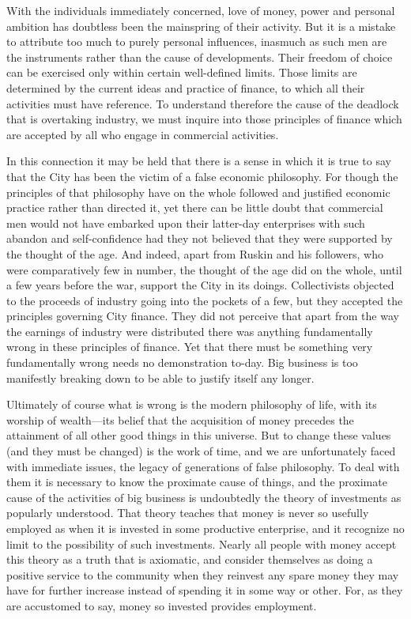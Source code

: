 \documentclass{book}
\begin{document}
With the individuals immediately concerned, love of money, power and personal ambition has doubtless been the mainspring of their activity. But it is a mistake to attribute too much to purely personal influences, inasmuch as such men are the instruments rather than the cause of developments. Their freedom of choice can be exercised only within certain well-defined limits. Those limits are determined by the current ideas and practice of finance, to which all their activities must have reference. To understand therefore the cause of the deadlock that is overtaking industry, we must inquire into those principles of finance which are accepted by all who engage in commercial activities.

In this connection it may be held that there is a sense in which it is true to say that the City has been the victim of a false economic philosophy. For though the principles of that philosophy have on the whole followed and justified economic practice rather than directed it, yet there can be little doubt that commercial men would not have embarked upon their latter-day enterprises with such abandon and self-confidence had they not believed that they were supported by the thought of the age. And indeed, apart from Ruskin and his followers, who were comparatively few in number, the thought of the age did on the whole, until a few years before the war, support the City in its doings. Collectivists objected to the proceeds of industry going into the pockets of a few, but they accepted the principles governing City finance. They did not perceive that apart from the way the earnings of industry were distributed there was anything fundamentally wrong in these principles of finance. Yet that there must be something very fundamentally wrong needs no demonstration to-day. Big business is too manifestly breaking down to be able to justify itself any longer.

Ultimately of course what is wrong is the modern philosophy of life, with its worship of wealth—its belief that the acquisition of money precedes the attainment of all other good things in this universe. But to change these values (and they must be changed) is the work of time, and we are unfortunately faced with immediate issues, the legacy of generations of false philosophy. To deal with them it is necessary to know the proximate cause of things, and the proximate cause of the activities of big business is undoubtedly the theory of investments as popularly understood. That theory teaches that money is never so usefully employed as when it is invested in some productive enterprise, and it recognize no limit to the possibility of such investments. Nearly all people with money accept this theory as a truth that is axiomatic, and consider themselves as doing a positive service to the community when they reinvest any spare money they may have for further increase instead of spending it in some way or other. For, as they are accustomed to say, money so invested provides employment.
\end{document}
